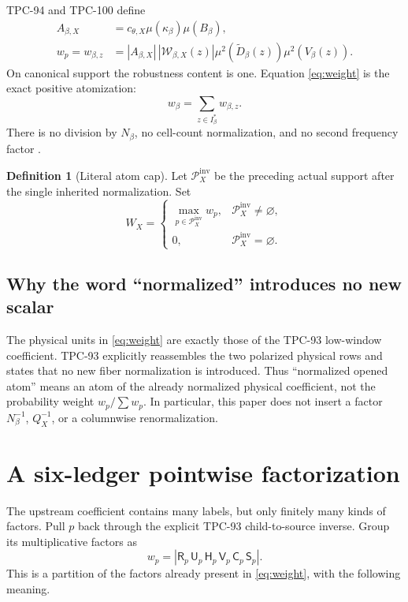 \documentclass[11pt]{article}
\theoremstyle{definition}
\newtheorem{definition}[theorem]{Definition}
\theoremstyle{remark}
\begin{document}
TPC-94 and TPC-100 define
\begin{align}
 A_{\beta,X}
 &=
 c_{\theta,X}\mu(\kappa_\beta)\mu(B_\beta),
\label{eq:outer}\\
 w_p=w_{\beta,z}
 &=
 |A_{\beta,X}|\,
 |\mathcal W_{\beta,X}(z)|
 \mu^2(\widetilde D_\beta(z))
 \mu^2(V_\beta(z)).
\label{eq:weight}
\end{align}
On canonical support the robustness content is one.  Equation
\eqref{eq:weight} is the exact positive atomization:
\[
 w_\beta=\sum_{z\in I_\beta^\ast}w_{\beta,z}.
\]
There is no division by \(N_\beta\), no cell-count normalization,
and no second frequency factor \citep{WangTPC94,WangTPC100}.

\begin{definition}[Literal atom cap]
\label{def:cap}
Let \(\mathscr P_X^{\mathrm{inv}}\) be the preceding actual support
after the single inherited normalization.  Set
\[
 W_X=
 \begin{cases}
 \max_{p\in\mathscr P_X^{\mathrm{inv}}}w_p,
   &\mathscr P_X^{\mathrm{inv}}\ne\varnothing,\\
 0,&\mathscr P_X^{\mathrm{inv}}=\varnothing.
 \end{cases}
\]
\end{definition}

\subsection{Why the word ``normalized'' introduces no new scalar}

The physical units in \eqref{eq:weight} are exactly those of the
TPC-93 low-window coefficient.  TPC-93 explicitly reassembles the
two polarized physical rows and states that no new fiber
normalization is introduced.  Thus ``normalized opened atom'' means
an atom of the already normalized physical coefficient, not the
probability weight \(w_p/\sum w_p\).  In particular, this paper
does not insert a factor \(N_\beta^{-1}\), \(Q_X^{-1}\), or a
columnwise renormalization.

\section{A six-ledger pointwise factorization}
\label{sec:factors}

The upstream coefficient contains many labels, but only finitely
many kinds of factors.  Pull \(p\) back through the explicit
TPC-93 child-to-source inverse.  Group its multiplicative factors
as
\begin{equation}
 w_p=
 |\mathsf R_p\,\mathsf U_p\,\mathsf H_p\,
   \mathsf V_p\,\mathsf C_p\,\mathsf S_p|.
\label{eq:six-factor}
\end{equation}
This is a partition of the factors already present in
\eqref{eq:weight}, with the following meaning.
\end{document}
